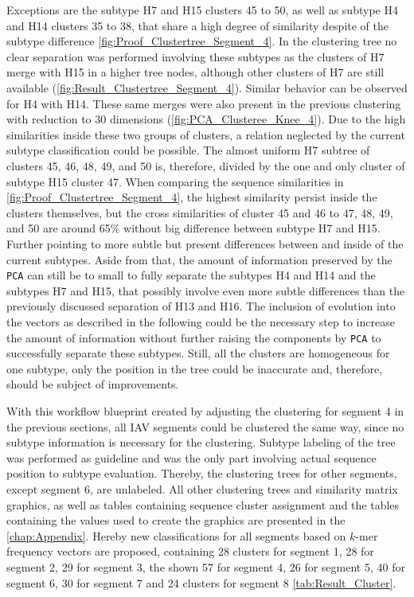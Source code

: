 \vspace{1em}

Exceptions are the subtype H7 and H15 clusters 45 to 50, as well as subtype H4 and H14 clusters 35 to 38, that share a high degree of similarity despite of the subtype difference \autoref{fig:Proof_Clustertree_Segment_4}. In the clustering tree no clear separation was performed involving these subtypes as the clusters of H7 merge with H15 in a higher tree nodes, although other clusters of H7 are still available (\autoref{fig:Result_Clustertree_Segment_4}). Similar behavior can be observed for H4 with H14. These same merges were also present in the previous clustering with reduction to 30 dimensions (\autoref{fig:PCA_Clusteree_Knee_4}). Due to the high similarities inside these two groups of clusters, a relation neglected by the current subtype classification could be possible. The almost uniform H7 subtree of clusters 45, 46, 48, 49, and 50 is, therefore, divided by the one and only cluster of subtype H15 cluster 47. When comparing the sequence similarities in \autoref{fig:Proof_Clustertree_Segment_4}, the highest similarity persist inside the clusters themselves, but the cross similarities of cluster 45 and 46 to 47, 48, 49, and 50 are around 65\% without big difference between subtype H7 and H15. Further pointing to more subtle but present differences between and inside of the current subtypes. Aside from that, the amount of information preserved by the \texttt{PCA} can still be to small to fully separate the subtypes H4 and H14 and the subtypes H7 and H15, that possibly involve even more subtle differences than the previously discussed separation of H13 and H16. The inclusion of evolution into the vectors as described in the following could be the necessary step to increase the amount of information without further raising the components by \texttt{PCA} to successfully separate these subtypes. Still, all the clusters are homogeneous for one subtype, only the position in the tree could be inaccurate and, therefore, should be subject of improvements.  

\vspace{1em}

With this workflow blueprint created by adjusting the clustering for segment 4 in the previous sections, all \gls{IAV} segments could be clustered the same way, since no subtype information is necessary for the clustering. Subtype labeling of the tree was performed as guideline and was the only part involving actual sequence position to subtype evaluation. Thereby, the clustering trees for other segments, except segment 6, are unlabeled. All other clustering trees and similarity matrix graphics, as well as tables containing sequence cluster assignment and the tables containing the values used to create the graphics are presented in the \autoref{chap:Appendix}. Hereby new classifications for all segments based on $k$-mer frequency vectors are proposed, containing 28 clusters for segment 1, 28 for segment 2, 29 for segment 3, the shown 57 for segment 4, 26 for segment 5, 40 for segment 6, 30 for segment 7 and 24 clusters for segment 8 \autoref{tab:Result_Cluster}. 

